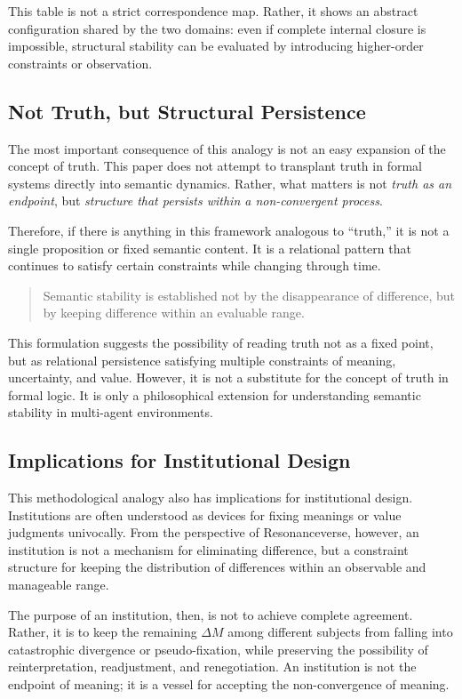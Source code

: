 \documentclass[11pt,a4paper]{article}
\theoremstyle{definition}
\begin{document}
This table is not a strict correspondence map. Rather, it shows an abstract configuration shared by the two domains: even if complete internal closure is impossible, structural stability can be evaluated by introducing higher-order constraints or observation.

\subsection{Not Truth, but Structural Persistence}

The most important consequence of this analogy is not an easy expansion of the concept of truth. This paper does not attempt to transplant truth in formal systems directly into semantic dynamics. Rather, what matters is not \textit{truth as an endpoint}, but \textit{structure that persists within a non-convergent process}.

Therefore, if there is anything in this framework analogous to ``truth,'' it is not a single proposition or fixed semantic content. It is a relational pattern that continues to satisfy certain constraints while changing through time.

\begin{quote}
Semantic stability is established not by the disappearance of difference, but by keeping difference within an evaluable range.
\end{quote}

This formulation suggests the possibility of reading truth not as a fixed point, but as relational persistence satisfying multiple constraints of meaning, uncertainty, and value. However, it is not a substitute for the concept of truth in formal logic. It is only a philosophical extension for understanding semantic stability in multi-agent environments.

\subsection{Implications for Institutional Design}

This methodological analogy also has implications for institutional design. Institutions are often understood as devices for fixing meanings or value judgments univocally. From the perspective of Resonanceverse, however, an institution is not a mechanism for eliminating difference, but a constraint structure for keeping the distribution of differences within an observable and manageable range.

The purpose of an institution, then, is not to achieve complete agreement. Rather, it is to keep the remaining $\Delta M$ among different subjects from falling into catastrophic divergence or pseudo-fixation, while preserving the possibility of reinterpretation, readjustment, and renegotiation. An institution is not the endpoint of meaning; it is a vessel for accepting the non-convergence of meaning.
\end{document}
